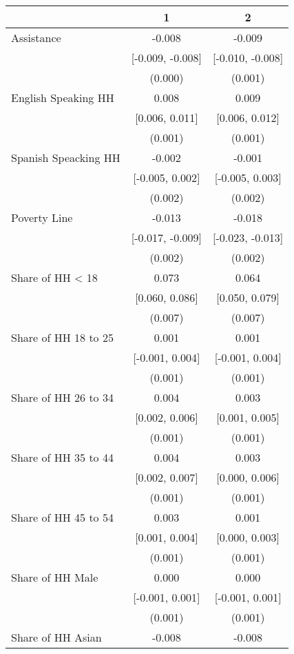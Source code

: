 \begin{table}[H]
\centering\begin{table}[H]
\centering
\begin{tabular}[t]{lcc}
\toprule
  & 1 & 2\\
\midrule
Assistance & -0.008 & -0.009\\
 & [-0.009, -0.008] & [-0.010, -0.008]\\
 & (0.000) & (0.001)\\
English Speaking HH & 0.008 & 0.009\\
 & [0.006, 0.011] & [0.006, 0.012]\\
 & (0.001) & \vphantom{8} (0.001)\\
Spanish Speacking HH & -0.002 & -0.001\\
 & [-0.005, 0.002] & [-0.005, 0.003]\\
 & (0.002) & \vphantom{1} (0.002)\\
Poverty Line & -0.013 & -0.018\\
 & [-0.017, -0.009] & [-0.023, -0.013]\\
 & (0.002) & (0.002)\\
Share of HH < 18 & 0.073 & 0.064\\
 & [0.060, 0.086] & [0.050, 0.079]\\
 & (0.007) & (0.007)\\
Share of HH 18 to 25 & 0.001 & 0.001\\
 & [-0.001, 0.004] & [-0.001, 0.004]\\
 & (0.001) & \vphantom{7} (0.001)\\
Share of HH 26 to 34 & 0.004 & 0.003\\
 & [0.002, 0.006] & [0.001, 0.005]\\
 & (0.001) & \vphantom{6} (0.001)\\
Share of HH 35 to 44 & 0.004 & 0.003\\
 & [0.002, 0.007] & [0.000, 0.006]\\
 & (0.001) & \vphantom{5} (0.001)\\
Share of HH 45 to 54 & 0.003 & 0.001\\
 & [0.001, 0.004] & [0.000, 0.003]\\
 & (0.001) & \vphantom{4} (0.001)\\
Share of HH Male & 0.000 & 0.000\\
 & [-0.001, 0.001] & [-0.001, 0.001]\\
 & (0.001) & \vphantom{3} (0.001)\\
Share of HH Asian & -0.008 & -0.008\\

\end{tabular}
\end{table}
\end{table}
